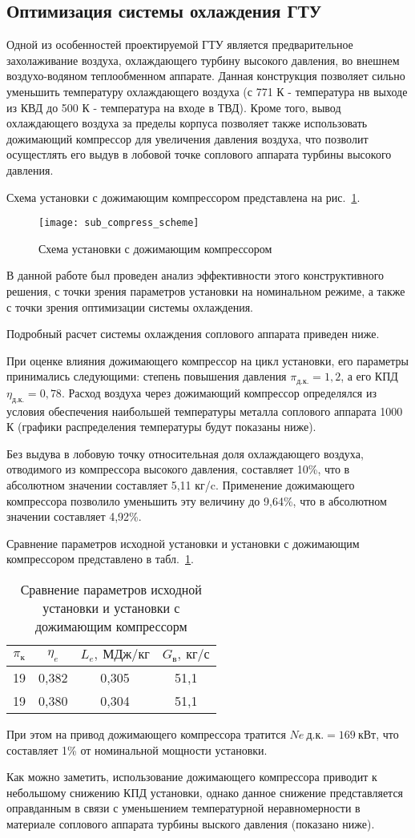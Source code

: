 \subsection{Оптимизация системы охлаждения ГТУ}
Одной из особенностей проектируемой ГТУ является предварительное захолаживание воздуха, охлаждающего турбину высокого
давления, во внешнем воздухо-водяном теплообменном аппарате. Данная конструкция позволяет сильно уменьшить температуру
охлаждающего воздуха (с 771 К - температура нв выходе из КВД до 500 К - температура на входе в ТВД). Кроме того,
вывод охлаждающего воздуха за пределы корпуса позволяет также использовать дожимающий компрессор для увеличения
давления воздуха, что позволит осущестлять его выдув в лобовой точке соплового аппарата турбины высокого давления.

Схема установки с дожимающим компрессором представлена на рис.~\ref{img:sub_compress_scheme}.

\begin{figure}[H]
    \centering
    \texttt{[image: sub\_compress\_scheme]}
    \caption{Схема установки с дожимающим компрессором}
	\label{img:sub_compress_scheme}
\end{figure}

В данной работе был проведен анализ эффективности этого конструктивного решения, с точки зрения параметров установки на номинальном режиме, а также с точки зрения оптимизации системы охлаждения. 

Подробный расчет системы охлаждения соплового аппарата приведен ниже.

При оценке влияния дожимающего компрессор на цикл установки, его параметры принимались следующими: степень
повышения давления $\pi_{д.к.} = 1,2$, а его КПД $\eta_{д.к.} = 0,78$.
Расход воздуха через дожимающий компрессор определялся из условия обеспечения наибольшей температуры металла соплового аппарата 1000 К (графики распределения температуры будут показаны ниже).

Без выдува в лобовую точку относительная доля охлаждающего воздуха, отводимого из компрессора высокого давления, составляет 10\%, что в абсолютном значении составляет 5,11 кг/c. Применение дожимающего компрессора позволило уменьшить эту величину до 9,64\%, что в абсолютном значении составляет 4,92\%.

Сравнение параметров исходной установки и установки с дожимающим компрессором представлено в табл.~\ref{tab:sub_compress_comparison}.
\begin{longtable}{|c|c|c|c|}
	\caption{Сравнение параметров исходной установки и установки с дожимающим компрессорм}
	\label{tab:sub_compress_comparison}
	\hline
	\textbf{$\pi_к$} & \textbf{$\eta_e$} & \textbf{$L_e, \ МДж/кг$} & \textbf{$G_в, \ кг/с$} \\ \hline
	19 & 0,382 & 0,305 & 51,1 \\ \hline
	19 & 0,380 & 0,304 & 51,1 \\ \hline
\end{longtable}
При этом на привод дожимающего компрессора тратится $N{e \ д.к.} = 169 \ кВт$, что составляет 1\% от номинальной мощности
установки.

Как можно заметить, использование дожимающего компрессора приводит к небольшому снижению КПД установки, однако данное снижение представляется оправданным в связи с уменьшением температурной неравномерности в материале соплового аппарата турбины выского давления (показано ниже).